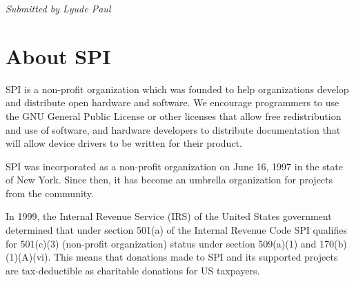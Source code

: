 \documentclass[a4paper]{report}
\begin{document}
{\em Submitted by Lyude Paul}


\appendix
\chapter{About SPI}

SPI is a non-profit organization which was founded to help organizations
develop and distribute open hardware and software. We encourage programmers
to use the GNU General Public License or other licenses that allow free
redistribution and use of software, and hardware developers to distribute
documentation that will allow device drivers to be written for their product.

SPI was incorporated as a non-profit organization on June 16, 1997 in the state
of New York. Since then, it has become an umbrella organization for projects
from the community.

In 1999, the Internal Revenue Service (IRS) of the United States government
determined that under section 501(a) of the Internal Revenue Code SPI
qualifies for 501(c)(3) (non-profit organization) status under section 509(a)(1)
and 170(b)(1)(A)(vi). This means that donations made to SPI and its
supported projects are tax-deductible as charitable donations for US taxpayers.

\newpage

\pagestyle{empty}


\null
\end{document}
